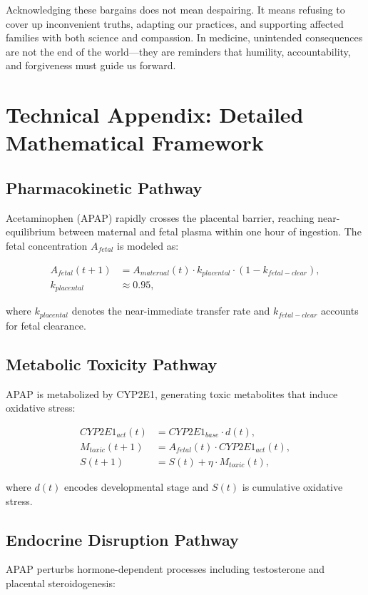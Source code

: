 \documentclass[12pt]{article}
\begin{document}
Acknowledging these bargains does not mean despairing. It means refusing to cover up inconvenient truths, adapting our practices, and supporting affected families with both science and compassion. In medicine, unintended consequences are not the end of the world---they are reminders that humility, accountability, and forgiveness must guide us forward.

\appendix

\section{Technical Appendix: Detailed Mathematical Framework}

\subsection{Pharmacokinetic Pathway}
Acetaminophen (APAP) rapidly crosses the placental barrier, reaching near-equilibrium between maternal and fetal plasma within one hour of ingestion. The fetal concentration $A_{fetal}$ is modeled as:

\begin{align}
A_{fetal}(t+1) &= A_{maternal}(t) \cdot k_{placental} \cdot (1 - k_{fetal-clear}), \\
k_{placental} &\approx 0.95,
\end{align}

where $k_{placental}$ denotes the near-immediate transfer rate and $k_{fetal-clear}$ accounts for fetal clearance.

\subsection{Metabolic Toxicity Pathway}
APAP is metabolized by CYP2E1, generating toxic metabolites that induce oxidative stress:

\begin{align}
CYP2E1_{act}(t) &= CYP2E1_{base} \cdot d(t), \\
M_{toxic}(t+1) &= A_{fetal}(t) \cdot CYP2E1_{act}(t), \\
S(t+1) &= S(t) + \eta \cdot M_{toxic}(t),
\end{align}

where $d(t)$ encodes developmental stage and $S(t)$ is cumulative oxidative stress.

\subsection{Endocrine Disruption Pathway}
APAP perturbs hormone-dependent processes including testosterone and placental steroidogenesis:
\end{document}
